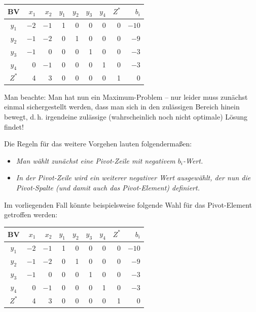 \begin{center}
  \begin{tabular}{|c|r|r|r|r|r|r|r|r|}
    \hline
    BV & $x_1$ & $x_2$ & $y_1$ & $y_2$ & $y_3$ & $y_4$ & $Z^*$ & $b_i$\\
    \hline
    $y_1$ & $-2$ & $-1$ & 1 & 0 & 0 & 0 & 0 & $-10$\\
    $y_2$ & $-1$ & $-2$ & 0 & 1 & 0 & 0 & 0 & $-9$\\
    $y_3$ & $-1$ & 0 & 0 & 0 & 1 & 0 & 0 & $-3$\\
    $y_4$ & 0 & $-1$ & 0 & 0 & 0 & 1 & 0 & $-3$\\
    $Z^*$ & 4 & 3 & 0 & 0 & 0 & 0 & 1 & 0\\
    \hline
  \end{tabular}
\end{center}

Man beachte: Man hat nun ein Maximum-Problem -- nur leider muss zunächst einmal sichergestellt werden, dass man sich in den zulässigen Bereich hinein bewegt, d.\,h. irgendeine zulässige (wahrscheinlich noch nicht optimale) Lösung findet!

Die Regeln für das weitere Vorgehen lauten folgendermaßen:
\begin{itemize}
  \item \emph{Man wählt zunächst eine Pivot-Zeile mit negativem $b_i$-Wert.}
  \item \emph{In der Pivot-Zeile wird ein weiterer negativer Wert ausgewählt, der nun die Pivot-Spalte (und damit auch das Pivot-Element) definiert.}
\end{itemize}

Im vorliegenden Fall könnte beispielsweise folgende Wahl für das Pivot-Element getroffen werden:

\begin{center}
  \begin{tabular}{|c|r|r|r|r|r|r|r|r|}
    \hline
    BV & $x_1$ & $x_2$ & $y_1$ & $y_2$ & $y_3$ & $y_4$ & $Z^*$ & $b_i$\\
    \hline
    $y_1$ & $\boxed{-2}$ & $-1$ & 1 & 0 & 0 & 0 & 0 & $-10$\\
    $y_2$ & $-1$ & $-2$ & 0 & 1 & 0 & 0 & 0 & $-9$\\
    $y_3$ & $-1$ & 0 & 0 & 0 & 1 & 0 & 0 & $-3$\\
    $y_4$ & 0 & $-1$ & 0 & 0 & 0 & 1 & 0 & $-3$\\
    $Z^*$ & 4 & 3 & 0 & 0 & 0 & 0 & 1 & 0\\
    \hline
  \end{tabular}
\end{center}

